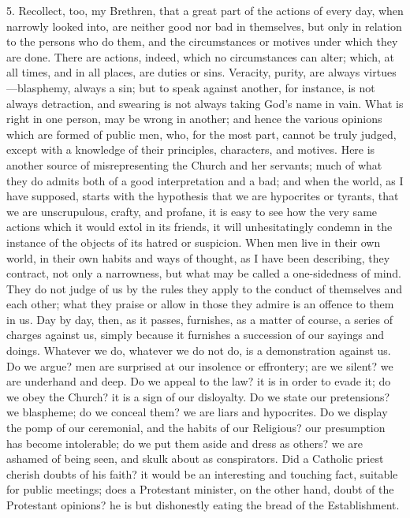 5. Recollect, too, my Brethren, that a great part of
the actions of every day, when narrowly looked into, are
neither good nor bad in themselves, but only in relation
to the persons who do them, and the circumstances or
motives under which they are done. There are actions,
indeed, which no circumstances can alter; which, at all
times, and in all places, are duties or sins. Veracity,
purity, are always virtues—blasphemy, always a sin;
but to speak against another, for instance, is not always
detraction, and swearing is not always taking God's name
in vain. What is right in one person, may be wrong in
another; and hence the various opinions which are formed
of public men, who, for the most part, cannot be truly
judged, except with a knowledge of their principles,
characters, and motives. Here is another source of
misrepresenting the Church and her servants; much of what
they do admits both of a good interpretation and a bad;
and when the world, as I have supposed, starts with the
hypothesis that we are hypocrites or tyrants, that we are
unscrupulous, crafty, and profane, it is easy to see how
the very same actions which it would extol in its
friends, it will unhesitatingly condemn in the instance
of the objects of its hatred or suspicion. When men live
in their own world, in their own habits and ways of
thought, as I have been describing, they contract, not
only a narrowness, but what may be called a one-sidedness
of mind. They do not judge of us by the rules they apply
to the conduct of themselves and each other; what they
praise or allow in those they admire is an offence to
them in us. Day by day, then, as it passes, furnishes, as
a matter of course, a series of charges against us,
simply because it furnishes a succession of our sayings
and doings. Whatever we do, whatever we do not do, is a
demonstration against us. Do we argue? men are surprised
at our insolence or effrontery; are we silent? we are
underhand and deep. Do we appeal to the law? it is in
order to evade it; do we obey the Church? it is a sign of
our disloyalty. Do we state our pretensions? we
blaspheme; do we conceal them? we are liars and
hypocrites. Do we display the pomp of our ceremonial, and
the habits of our Religious? our presumption has become
intolerable; do we put them aside and dress as others? we
are ashamed of being seen, and skulk about as
conspirators. Did a Catholic priest cherish doubts of his
faith? it would be an interesting and touching fact,
suitable for public meetings; does a Protestant minister,
on the other hand, doubt of the Protestant opinions? he
is but dishonestly eating the bread of the Establishment.
